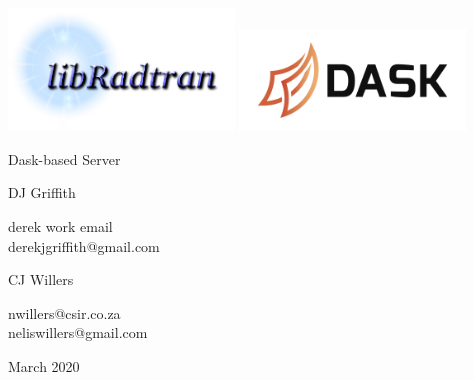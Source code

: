 
\thispagestyle{empty}

{
\sffamily
\centering
\large

~\vspace{\fill}

\vspace{2cm}
\includegraphics[width=0.45\textwidth]{pic/libradtran.png}
\includegraphics[width=0.45\textwidth]{pic/dask.png}

\vspace{3cm}
{\huge Dask-based \libradtran{} Server }

\vspace{1.5cm}
{\Large DJ Griffith }

\vspace{2mm}
derek work email\\
derekjgriffith@gmail.com

\vspace{1.5cm}
{\Large CJ Willers }

\vspace{2mm}
nwillers@csir.co.za\\
neliswillers@gmail.com


\vspace{\fill}

March 2020

}

\clearpage
\tableofcontents*

\clearpage
\listoffigures*

\clearpage


\clearpage
\listoftodos